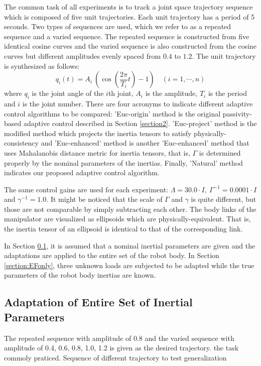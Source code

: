 \documentclass[letterpaper, 10 pt, conference]{ieeeconf}  %
\begin{document}
The common task of all experiments is to track a joint space trajectory sequence which is composed of five unit trajectories. Each unit trajectory has a period of 5 seconds. Two types of sequences are used, which we refer to as a repeated sequence and a varied sequence. The repeated sequence is constructed from five identical cosine curves and the varied sequence is also constructed from the cosine curves but different amplitudes evenly spaced from $0.4$ to $1.2$. The unit trajectory is synthesized as follows:
\begin{equation*}
	q_i(t) = A_i~(\cos(\frac{2\pi}{T_i}t)-1)  \quad (i=1,\cdots,n)
\end{equation*}
where $q_i$ is the joint angle of the $i$th joint, $A_i$ is the amplitude,  $T_i$ is the period and $i$ is the joint number. There are four acronyms to indicate different adaptive control algorithms to be compared: 'Euc-origin' method is the original passivity-based adaptive control described in Section \ref{section2}. 'Euc-project' method is the modified method which projects the inertia tensors to satisfy physically-consistency and 'Euc-enhanced' method is another 'Euc-enhanced' method that uses Mahalanobis distance metric for inertia tensors, that is, $\Gamma$ is determined properly by the nominal parameters of the inertias. Finally, 'Natural' method indicates our proposed adaptive control algorithm. 

The same control gains are used for each experiment:  $\Lambda = 30.0\cdot I, ~\Gamma^{-1} = 0.0001\cdot I$ and $\gamma^{-1} = 1.0$. It might be noticed that the scale of $\Gamma$ and $\gamma$ is quite different, but those are not comparable by simply subtracting each other. The body links of the manipulator are visualized as ellipsoids which are physically-equivalent. That is, the inertia tensor of an ellipsoid is identical to that of the corresponding link. 

In Section \ref{section:entire}, it is assumed that a nominal inertial parameters are given and the adaptations are applied to the entire set of the robot body. In Section \ref{section:EFonly}, three unknown loads are subjected to be adapted while the true parameters of the robot body inertias are known.

\subsection{Adaptation of Entire Set of Inertial Parameters} \label{section:entire}
The repeated sequence with amplitude of 0.8 and the varied sequence with amplitude of 0.4, 0.6, 0.8, 1.0, 1.2 is given as the desired trajectory. the task commoly praticed.
Sequence of different trajectory to test generalization
\end{document}
